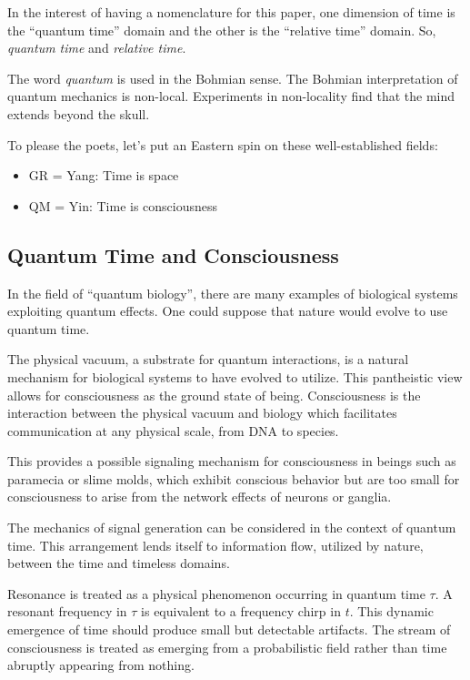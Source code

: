 In the interest of having a nomenclature for this paper, one dimension of time
is the ``quantum time'' domain and the other is the ``relative time'' domain.
So, \textit{quantum time} and \textit{relative time}.

The word \textit{quantum} is used in the Bohmian sense.
The Bohmian interpretation of quantum mechanics is non-local.
Experiments in non-locality \cite{Achterberg} find that the mind extends beyond
the skull. 

To please the poets, let's put an Eastern spin on these 
well-established fields:

\begin{itemize}
  \item GR = Yang: Time is space
  \item QM = Yin: Time is consciousness
\end{itemize}

\subsection{Quantum Time and Consciousness}

In the field of ``quantum biology'',
there are many examples of biological systems exploiting quantum effects.
One could suppose that nature would evolve to use quantum time.

The physical vacuum, a substrate for quantum interactions,
is a natural mechanism for biological systems to have evolved to utilize.
This pantheistic view allows for consciousness as the ground state of being.
Consciousness is the interaction between the physical vacuum and biology which
facilitates communication at any physical scale, from DNA to species.

This provides a possible signaling mechanism for consciousness in beings such
as paramecia or slime molds, which exhibit conscious behavior but are too small
for consciousness to arise from the network effects of neurons or ganglia.

The mechanics of signal generation can be considered in the context of
quantum time.
This arrangement lends itself to information flow, utilized by nature,
between the time and timeless domains.

Resonance is treated as a physical phenomenon occurring in quantum time $\tau$.
A resonant frequency in $\tau$ is equivalent to a frequency chirp in $t$.
This dynamic emergence of time should produce small but detectable artifacts.
The stream of consciousness is treated as emerging from a probabilistic field
rather than time abruptly appearing from nothing.


